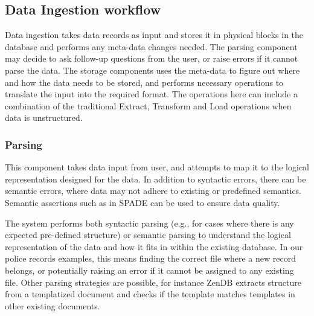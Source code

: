\subsection{Data Ingestion workflow}
Data ingestion takes data records as input and stores it in physical blocks in the database and performs any meta-data changes needed. The parsing component may decide to ask follow-up questions from the user, or raise errors if it cannot parse the data. The storage components uses the meta-data to figure out where and how the data needs to be stored, and performs necessary operations to translate the input into the required format. The operations here can include a combination of the traditional Extract, Transform and Load operations when data is unstructured.



\subsubsection{Parsing}
This component takes data input from user, and attempts to map it to the logical representation designed for the data. In addition to syntactic errors, there can be semantic errors, where data may not adhere to existing or predefined semantics. Semantic assertions such as in SPADE\cite{shankar2024spade} can be used to ensure data quality. 

The system performs both syntactic parsing (e.g., for cases where there is any expected pre-defined structure) or semantic parsing to understand the logical representation of the data and how it fits in within the existing database. In our police records examples, this means finding the correct file where a new record belongs, or potentially raising an error if it cannot be assigned to any existing file. Other parsing strategies are possible, for instance ZenDB\cite{lin2024towards} extracts structure from a templatized document and checks if the template matches templates in other existing documents.  


